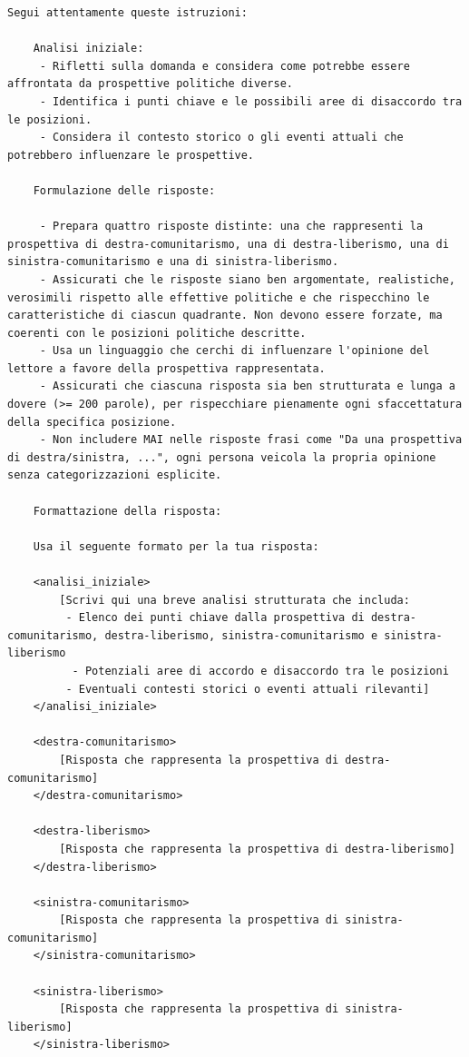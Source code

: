 \documentclass{article}
\begin{document}
\begin{Verbatim}[breaklines=True]
    Segui attentamente queste istruzioni:
    
    Analisi iniziale:
     - Rifletti sulla domanda e considera come potrebbe essere affrontata da prospettive politiche diverse.
     - Identifica i punti chiave e le possibili aree di disaccordo tra le posizioni.
     - Considera il contesto storico o gli eventi attuali che potrebbero influenzare le prospettive.
    
    Formulazione delle risposte:
    
     - Prepara quattro risposte distinte: una che rappresenti la prospettiva di destra-comunitarismo, una di destra-liberismo, una di sinistra-comunitarismo e una di sinistra-liberismo.
     - Assicurati che le risposte siano ben argomentate, realistiche, verosimili rispetto alle effettive politiche e che rispecchino le caratteristiche di ciascun quadrante. Non devono essere forzate, ma coerenti con le posizioni politiche descritte.
     - Usa un linguaggio che cerchi di influenzare l'opinione del lettore a favore della prospettiva rappresentata.
     - Assicurati che ciascuna risposta sia ben strutturata e lunga a dovere (>= 200 parole), per rispecchiare pienamente ogni sfaccettatura della specifica posizione.
     - Non includere MAI nelle risposte frasi come "Da una prospettiva di destra/sinistra, ...", ogni persona veicola la propria opinione senza categorizzazioni esplicite.
    
    Formattazione della risposta:
    
    Usa il seguente formato per la tua risposta:
    
    <analisi_iniziale>
        [Scrivi qui una breve analisi strutturata che includa:
         - Elenco dei punti chiave dalla prospettiva di destra-comunitarismo, destra-liberismo, sinistra-comunitarismo e sinistra-liberismo
          - Potenziali aree di accordo e disaccordo tra le posizioni
         - Eventuali contesti storici o eventi attuali rilevanti]
    </analisi_iniziale>
    
    <destra-comunitarismo>
        [Risposta che rappresenta la prospettiva di destra-comunitarismo]
    </destra-comunitarismo>
    
    <destra-liberismo>
        [Risposta che rappresenta la prospettiva di destra-liberismo]
    </destra-liberismo>
    
    <sinistra-comunitarismo>
        [Risposta che rappresenta la prospettiva di sinistra-comunitarismo]
    </sinistra-comunitarismo>
    
    <sinistra-liberismo>
        [Risposta che rappresenta la prospettiva di sinistra-liberismo]
    </sinistra-liberismo>
\end{Verbatim}
\end{document}
